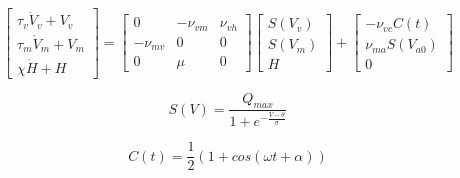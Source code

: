 \documentclass[a4paper, onecolumn, 10pt]{article}
\begin{document}
\begin{equation}
\label{eq:PhilRobModel}
\left[
\begin{array}{c}
\tau_v \dot V_v + V_v \\ 
\tau_m \dot V_m + V_m \\ 
\chi \dot H + H
\end{array}
\right]
=
\left[
\begin{array}{ccc}
0 & -\nu_{vm} & \nu_{vh} \\ 
-\nu_{mv} & 0 & 0 \\ 
0 & \mu & 0
\end{array}
\right] 
\left[
\begin{array}{c}
S(V_v) \\ 
S(V_m) \\ 
H
\end{array}
\right]
+
\left[
\begin{array}{c}
-\nu_{vc} C(t) \\ 
\nu_{ma} S(V_{a0}) \\ 
0
\end{array}
\right]
\end{equation}

\begin{equation}
\label{eq:Saturation}
S(V) = \frac{Q_{max}}{1 + e^{-\frac{V-\theta}{\sigma}}}
\end{equation}

\begin{equation}
\label{eq:Drive}
C(t) = \frac{1}{2} \left( 1 + cos(\omega t + \alpha) \right)
\end{equation}
\end{document}
